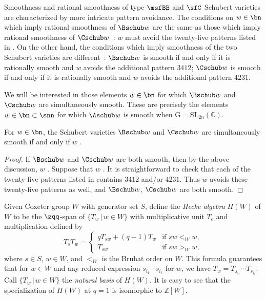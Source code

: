 Smoothness and rational smoothness of type-$\msfBB$ and
$\sfC$
Schubert varieties are characterized by more intricate pattern avoidance.
The conditions on $w \in \bn$ which imply
rational smoothness of
$\Bschub w$
are the same as those which imply
rational smoothness of
$\Cschub w$~\cite[Thm.\,4.2]{BilleyPattern}:
$w$ must avoid the twenty-five
patterns listed in \cite[Eq.\,(13.3.5)]{BilleyLak}.
On the other hand, the conditions which imply smoothness of the two
Schubert varieties are different~\cite[Thm.\,8.3.17]{BilleyLak}:
$\Bschub w$
is smooth if and only if it is rationally smooth and
$w$ avoids the additional pattern $3412$;
$\Cschub w$
is smooth if and only if it is rationally smooth and
$w$ avoids the additional pattern $4231$.

We will be interested in those elements $w \in \bn$ for which
$\Bschub w$
and
$\Cschub w$
are simultaneously smooth.
These are precisely the elements $w \in \bn \subset \snn$ for which
$\Aschub w$ is smooth when $\mathrm G = \mathrm{SL}_{2n}(\mathbb C)$.
\begin{prop}\label{p:bcavoid}
  For $w \in \bn$,
  the
  Schubert varieties
  $\Bschub w$
  and
  $\Cschub w$
  are simultaneously smooth
  if and only if
  $w$ \avoidsp.
\end{prop}
\begin{proof}
  If $\Bschub w$
  and
  $\Cschub w$
  are both smooth, then
  by the above discussion,
  $w$ \avoidsp.
  Suppose that
  $w$ \avoidsp.
  It is straightforward to check that  
  each of the twenty-five patterns listed in
  \cite[Eq.\,(13.3.5)]{BilleyLak}
  contains $3412$ and/or $4231$.
  Thus
  $w$ avoids these twenty-five patterns as well,
  and
  $\Bschub w$,
  $\Cschub w$
  are both smooth.
\end{proof}

\label{ss:hecke}

Given Coxeter group $W$ with generator set $S$, define
the {\em Hecke algebra} $H(W)$ of $W$ to be
the $\zqq$-span of $\{ T_w \,|\, w \in W \}$
with multiplicative unit $T_e$ and multiplication defined by
\begin{equation*}
  T_sT_w =
  \begin{cases}
    qT_{sw} + (q-1)T_w &\text{if $sw <_W w$},\\
    T_{sw} &\text{if $sw >_W w$},
  \end{cases}
\end{equation*}
where $s \in S$, $w \in W$, and $<_W$ is the Bruhat order on $W$.
This formula guarantees that for $w \in W$ and
any reduced expression $s_{i_1} \cdots s_{i_\ell}$ for $w$,
we have $T_w = T_{s_{i_1}} \cdots T_{s_{i_\ell}}$.
Call $\{ T_w \,|\, w \in W \}$ the {\em natural basis} of $H(W)$.
It is easy to see that the specialization of $H(W)$ at $q=1$
is isomorphic to $\mathbb Z[W]$.

